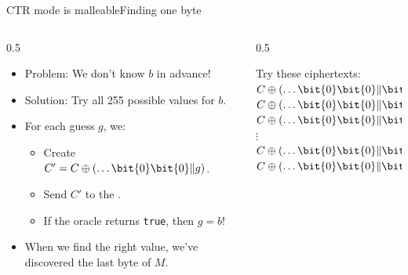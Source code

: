 \ifdefined\PRESENTATION\else\PassOptionsToClass{handout}{beamer}\fi\documentclass[aspectratio=169, lualatex]{beamer}
\begin{document}
\begin{frame}{CTR mode is malleable}{Finding one byte}
	\begin{columns}[c]
		\begin{column}{0.5\textwidth}
			\begin{itemize}
				\item Problem: We don't know $b$ in advance!
				\item Solution: Try all 255 possible values for $b$.
				\item For each guess $g$, we:
				      \begin{itemize}
					      \item Create $C' = C \oplus (\ldots \bit{0}\bit{0} \| g)$.
					      \item Send $C'$ to the .
					      \item If the oracle returns \texttt{true}, then $g = b$!
				      \end{itemize}
				\item When we find the right value, we've discovered the last byte of $M$.
			\end{itemize}
		\end{column}
		\begin{column}{0.5\textwidth}
			\begin{center}
				Try these ciphertexts:\\
				$C \oplus (\ldots \bit{0}\bit{0} \| \bit{0}\bit{1})$\\
				$C \oplus (\ldots \bit{0}\bit{0} \| \bit{0}\bit{2})$\\
				$C \oplus (\ldots \bit{0}\bit{0} \| \bit{0}\bit{3})$\\
				$\vdots$\\
				$C \oplus (\ldots \bit{0}\bit{0} \| \bit{f}\bit{e})$\\
				$C \oplus (\ldots \bit{0}\bit{0} \| \bit{f}\bit{f})$
			\end{center}
		\end{column}
	\end{columns}
\end{frame}
\end{document}
